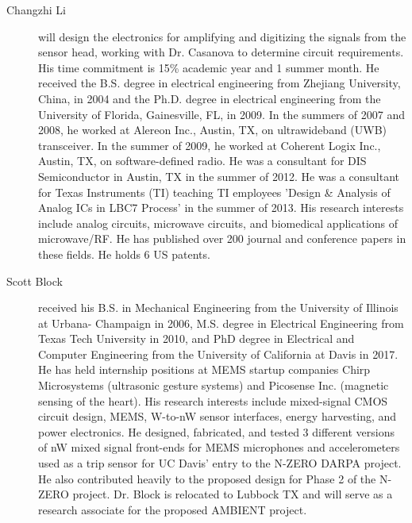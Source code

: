 \begin{description}
  \item[Changzhi Li] will design the electronics for amplifying and digitizing the signals from the sensor head, working with Dr. Casanova to determine circuit requirements. His time commitment is 15\% academic year and 1 summer month. He received the B.S. degree in electrical engineering from Zhejiang University, China, in 2004 and the Ph.D. degree in electrical engineering from the University of Florida, Gainesville, FL, in 2009. In the summers of 2007 and 2008, he worked at Alereon Inc., Austin, TX, on ultrawideband (UWB) transceiver. In the summer of 2009, he worked at Coherent Logix Inc., Austin, TX, on software-defined radio. He was a consultant for DIS Semiconductor in Austin, TX in the summer of 2012. He was a consultant for Texas Instruments (TI) teaching TI employees 'Design \& Analysis of Analog ICs in LBC7 Process' in the summer of 2013. His research interests include analog circuits, microwave circuits, and biomedical applications of microwave/RF. He has published over 200 journal and conference papers in these fields. He holds 6 US patents.
  \item[Scott Block] received his B.S. in Mechanical Engineering from the University of Illinois at Urbana- Champaign in 2006, M.S. degree in Electrical Engineering from Texas Tech University in 2010, and PhD degree in Electrical and Computer Engineering from the University of California at Davis in 2017. He has held internship positions at MEMS startup companies Chirp Microsystems (ultrasonic gesture systems) and Picosense Inc. (magnetic sensing of the heart). His research interests include mixed-signal CMOS circuit design, MEMS, W-to-nW sensor interfaces, energy harvesting, and power electronics. He designed, fabricated, and tested 3 different versions of nW mixed signal front-ends for MEMS microphones and accelerometers used as a trip sensor for UC Davis’ entry to the N-ZERO DARPA project. He also contributed heavily to the proposed design for Phase 2 of the N-ZERO project. Dr. Block is relocated to Lubbock TX and will serve as a research associate for the proposed AMBIENT project.
  
\end{description}


